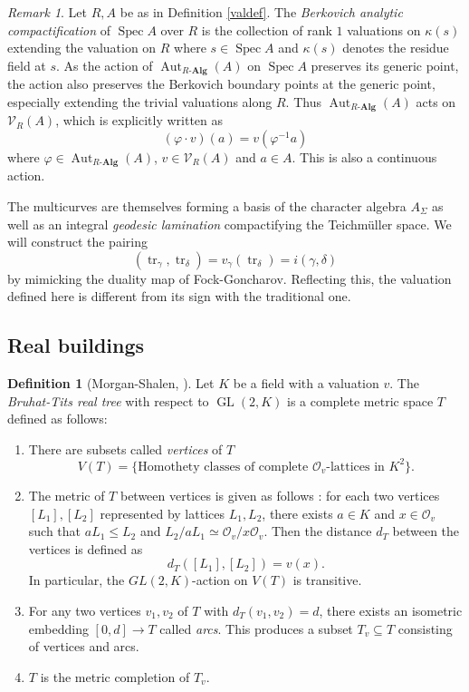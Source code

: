 \documentclass[11pt]{amsart}
\numberwithin{theorem}{section}
\theoremstyle{definition}
\newtheorem{definition}[theorem]{Definition}
\theoremstyle{remark}
\newtheorem*{remark}{Remark}
\newcommand{\Ocal}{{\mathcal{O}}}
\newcommand{\Vcal}{{\mathcal{V}}}
\DeclareMathOperator{\Aut}{Aut}
\DeclareMathOperator{\GL}{GL}
\DeclareMathOperator{\Spec}{Spec}
\DeclareMathOperator{\tr}{tr}
\newcommand{\<}{\langle}
\renewcommand{\>}{\rangle}
\begin{document}
\begin{remark}
     Let $R, A$ be as in Definition \ref{valdef}. The \textit{Berkovich analytic compactification} of $\Spec A$ over $R$ is the collection of rank $1$ valuations on $\kappa(s)$ extending the valuation on $R$ where $s \in \Spec A$ and $\kappa(s)$ denotes the residue field at $s$. As the action of $\Aut_{R\text{-}\mathbf{Alg}}(A)$ on $\Spec A$ preserves its generic point, the action also preserves the Berkovich boundary points at the generic point, especially extending the trivial valuations along $R$. Thus $\Aut_{R\text{-}\mathbf{Alg}}(A)$ acts on $\Vcal_R(A)$, which is explicitly written as
     \[
     (\varphi \cdot v)(a) = v(\varphi^{-1} a)
     \]
     where $\varphi \in \Aut_{R\text{-}\mathbf{Alg}}(A)$, $v \in \Vcal_R(A)$ and $a \in A$. This is also a continuous action.
\end{remark}

The multicurves are themselves forming a basis of the character algebra $A_\Sigma$ as well as an integral \textit{geodesic lamination} compactifying the Teichm\"uller space. We will construct the pairing
\[
(\tr_\gamma, \tr_\delta) = v_{\gamma}(\tr_\delta) = i(\gamma, \delta)
\]
by mimicking the duality map of Fock-Goncharov. Reflecting this, the valuation defined here is different from its sign with the traditional one. 

\subsection{Real buildings}

\begin{definition}[Morgan-Shalen, \cite{morgan1984valuations}]
    Let $K$ be a field with a valuation $v$. The \textit{Bruhat-Tits real tree} with respect to $\GL(2, K)$ is a complete metric space $T$ defined as follows:
    \begin{enumerate}
        \item There are subsets called \textit{vertices} of $T$
        \[
        V(T) = \{ \text{Homothety classes of complete $\Ocal_v$-lattices in $K^2$} \}.
        \]
        \item The metric of $T$ between vertices is given as follows : for each two vertices $[L_1], [L_2]$ represented by lattices $L_1, L_2$, there exists $a \in K$ and $x \in \Ocal_v$ such that $aL_1 \leq L_2$ and $L_2 / aL_1 \simeq \Ocal_v / x\Ocal_v$. Then the distance $d_T$ between the vertices is defined as
        \[
        d_T([L_1], [L_2]) = v(x).
        \]
        In particular, the $GL(2, K)$-action on $V(T)$ is transitive.
        \item For any two vertices $v_1, v_2$ of $T$ with $d_T(v_1, v_2) = d$, there exists an isometric embedding $[0, d] \rightarrow T$ called \textit{arcs}. This produces a subset $T_v \subseteq T$ consisting of vertices and arcs.
        \item $T$ is the metric completion of $T_v$. 
    \end{enumerate}
\end{definition}
\end{document}
